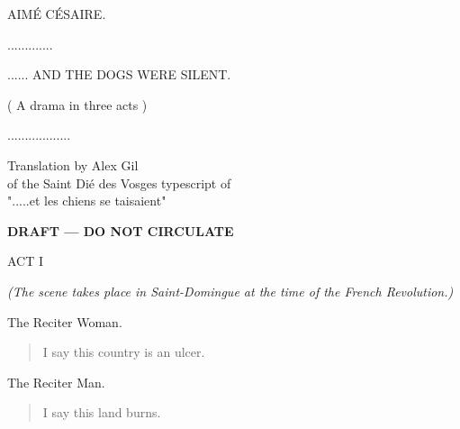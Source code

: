 \documentclass[letterpaper,article,12pt,oneside,notitlepage]{memoir}
\begin{document}
\thispagestyle{empty}

\clearpage

\begin{center}AIMÉ CÉSAIRE.\end{center}
\begin{center}.............\end{center}

\vspace{2cm}

\begin{center}...... AND THE DOGS WERE SILENT.\end{center}
\begin{center}( A drama in three acts )\end{center}
\begin{center}..................\end{center}

\vspace{6cm}

\begin{center}Translation by Alex Gil \\ of the Saint Dié des Vosges typescript of \\ ".....et les chiens se taisaient"\end{center}
\vspace{1cm}
\begin{center}\textbf{DRAFT — DO NOT CIRCULATE}\end{center}

\clearpage


\begin{center}ACT I\end{center}
\vspace{1cm}

\textit{(The scene takes place in Saint-Domingue at the time of the French Revolution.)}

\begin{center}The Reciter Woman.\end{center}

\begin{verse}
I say this country is an ulcer. \\
\end{verse}

\begin{center}The Reciter Man.\end{center}

\begin{verse}
I say this land burns. \\
\end{verse}
\end{document}
